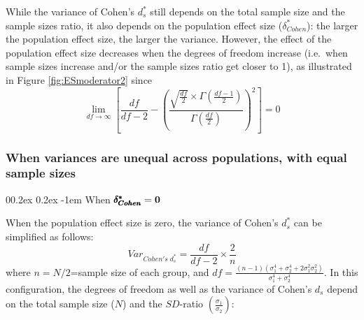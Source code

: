 \documentclass[
  english,
  man,mask]{apa6}
\makeatletter
\let\oldparagraph\paragraph
\renewcommand{\paragraph}[1]{\oldparagraph{#1}\mbox{}}
\renewcommand{\paragraph}{\@startsection{paragraph}{4}{\parindent}%
  {0\baselineskip \@plus 0.2ex \@minus 0.2ex}%
  {-1em}%
  {\normalfont\normalsize\bfseries\itshape\typesectitle}}
\makeatother
\begin{document}
While the variance of Cohen's \(d^*_s\) still depends on the total sample size and the sample sizes ratio, it also depends on the population effect size (\(\delta^*_{Cohen}\)): the larger the population effect size, the larger the variance. However, the effect of the population effect size decreases when the degrees of freedom increase (i.e.~when sample sizes increase and/or the sample sizes ratio get closer to 1), as illustrated in Figure \ref{fig:ESmoderator2} since
\[\lim_{df\rightarrow \infty}\left[\frac{df}{df-2} - \left( \frac{\sqrt{\frac{df}{2}} \times \Gamma \left(\frac{df-1}{2} \right)}{\Gamma \left( \frac{df}{2}\right)}\right)^2 \right]=0\]

\hypertarget{when-variances-are-unequal-across-populations-with-equal-sample-sizes-1}{%
\subsubsection{When variances are unequal across populations, with equal sample sizes}\label{when-variances-are-unequal-across-populations-with-equal-sample-sizes-1}}

\hypertarget{when-bf-pmbdelta_cohen0-2}{%
\paragraph{\texorpdfstring{When \(\bf \pmb{\delta^*_{Cohen}}=0\)}{When \textbackslash bf \textbackslash pmb\{\textbackslash delta\^{}*\_\{Cohen\}\}=0}}\label{when-bf-pmbdelta_cohen0-2}}

When the population effect size is zero, the variance of Cohen's \(d^*_s\) can be simplified as follows:
\[Var_{Cohen's \; d^*_s} = \frac{df}{df-2} \times \frac{2}{n}\]
where \(n=N/2\)=sample size of each group, and \(df=\frac{(n-1)(\sigma^4_1+\sigma^4_2+2\sigma^2_1\sigma^2_2)}{\sigma^4_1+\sigma^4_2}\). In this configuration, the degrees of freedom as well as the variance of Cohen's \(d_s\) depend on the total sample size (\(N\)) and the \(SD\)-ratio \(\left( \frac{\sigma_1}{\sigma_2}\right)\):
\end{document}
